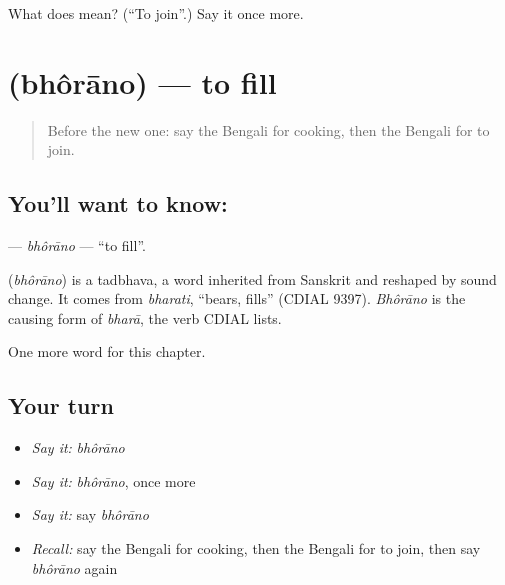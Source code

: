 \begin{tcolorbox}[breakable,colback=teal!4,colframe=teal!35!black,title={Before you move on}]
What does  mean? (\textquotedblleft{}To join\textquotedblright{}.) Say it once more.
\end{tcolorbox}
\section[\texorpdfstring{\bn{ভরানো} (bhôrāno)}{ভরানো (bhôrāno)}]{ (bhôrāno) — to fill}

\label{lesson:BN-C101-bhorano}



\begin{quote}
Before the new one: say the Bengali for cooking, then the Bengali for to join.
\end{quote}

\subsection*{You'll want to know: }
\textbf{} — \emph{bhôrāno} — \textquotedblleft{}to fill\textquotedblright{}.

\begin{cousinweb}
\textbf{} (\emph{bhôrāno}) is a tadbhava, a word inherited from Sanskrit and reshaped by sound change. It comes from \emph{bharati}, \textquotedblleft{}bears, fills\textquotedblright{} (CDIAL 9397). \emph{Bhôrāno} is the causing form of \emph{bharā}, the verb CDIAL lists.
\end{cousinweb}

\begin{grammarlens}[title={What you've built}]
One more word for this chapter.
\end{grammarlens}

\subsection*{Your turn}
\begin{itemize}
\raggedright
  \item \emph{Say it:} \emph{bhôrāno}
  \item \emph{Say it:} \emph{bhôrāno}, once more
  \item \emph{Say it:} say \emph{bhôrāno}
  \item \emph{Recall:} say the Bengali for cooking, then the Bengali for to join, then say \emph{bhôrāno} again
\end{itemize}

